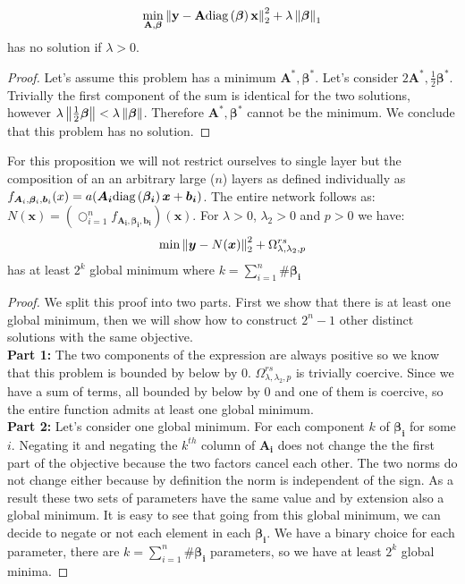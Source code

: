 \begin{proposition}
\label{unconstrained_shrinknet_no_min}
\begin{equation*}
     \min_{\bf{A}, \bm{\beta}} \left\lVert\bf{y} - \bf{A}\text{diag}\left(\bm{\beta}\right)\bf{x}\right\rVert_2^2 + \lambda \left\lVert\bm{\beta}\right\rVert_1
\end{equation*}
has no solution if $\lambda > 0$.
\end{proposition}
\begin{proof}
  Let's assume this problem has a minimum $\bm{A}^*, \bm{\beta}^*$. Let's consider $2\bm{A}^*, \frac{1}{2}\bm{\beta}^*$. Trivially the first component of the sum is identical for the two solutions, however $\lambda\left\lVert\frac{1}{2}\bm{\beta}\right\rVert < \lambda\left\lVert\bm{\beta}\right\rVert$. Therefore $\bm{A}^*, \bm{\beta}^*$ cannot be the minimum. We conclude that this problem has no solution.
\end{proof}
\begin{proposition}
  \label{shrinknet_regularized_minimum}
For this proposition we will not restrict ourselves to single layer but the composition of an an arbitrary large ($n$) layers as defined individually as $f_{\bm{A}_i, \bm{\beta}_i, \bm{b}_i}(x) = a(\bm{A_i}\text{diag}\left(\bm{\beta_i}\right)\bm{x} + \bm{b_i})$. The entire network follows as: $N(\bm{x}) = \left(\bigcirc_{i=1}^n f_{\bm{A_i}, \bm{\beta_i}, \bm{b_i}}\right)(\bm{x})$. For $\lambda > 0$, $\lambda_2 > 0$ and $p > 0$ we have:
  \begin{equation*}
    \min \left\lVert\bm{y} - N(\bm{x})\right\rVert_2^2 + \Omega_{\lambda, \lambda_2, p}^{rs}
  \end{equation*}
  has at least $2^k$ global minimum where $k = \sum_{i=1}^n \#\bm{\beta_i}$
\end{proposition}

\begin{proof}
  We  split this proof into two parts. First we show that there is at least
  one global minimum, then we will show how to construct $2^n - 1$ other distinct
  solutions with the same objective.
\\ \textbf{Part 1:}
The two components of the expression are always positive so we know that this problem is bounded by below by $0$. $\Omega_{\lambda, \lambda_2, p}^{rs}$ is trivially coercive. Since we have a sum of terms, all bounded by below by $0$ and one of them is coercive, so the entire function admits at least one global minimum.
\\ \textbf{Part 2:} Let's consider one global minimum. For each component $k$ of $\bm{\beta_i}$ for some $i$. Negating it and negating the $k^{th}$ column of $\bm{A_i}$ does not change the the first part of the objective because the two factors cancel each other. The two norms do not change either because by definition the norm is independent of the sign. As a result these two sets of parameters have the same value and by extension also a global minimum. It is easy to see that going from this global minimum, we can decide to negate or not each element in each $\bm{\beta_i}$. We have a binary choice for each parameter, there are $k = \sum_{i=1}^n \#\bm{\beta_i}$ parameters, so we have at least $2^k$ global minima.

\end{proof}

